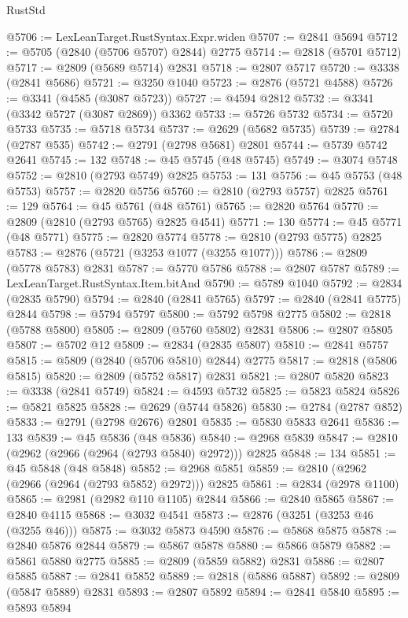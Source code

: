 \begin{lexlean}{RustStd}
\begin{coremodule}
@5706 := LexLeanTarget.RustSyntax.Expr.widen
@5707 := @2841 @5694
@5712 := @5705 (@2840 (@5706 @5707) @2844) @2775
@5714 := @2818 (@5701 @5712)
@5717 := @2809 (@5689 @5714) @2831
@5718 := @2807 @5717
@5720 := @3338 (@2841 @5686)
@5721 := @3250 @1040
@5723 := @2876 (@5721 @4588)
@5726 := @3341 (@4585 (@3087 @5723))
@5727 := @4594 @2812
@5732 := @3341 (@3342 @5727 (@3087 @2869)) @3362
@5733 := @5726 @5732
@5734 := @5720 @5733
@5735 := @5718 @5734
@5737 := @2629 (@5682 @5735)
@5739 := @2784 (@2787 @535)
@5742 := @2791 (@2798 @5681) @2801
@5744 := @5739 @5742 @2641
@5745 := 132
@5748 := @45 @5745 (@48 @5745)
@5749 := @3074 @5748
@5752 := @2810 (@2793 @5749) @2825
@5753 := 131
@5756 := @45 @5753 (@48 @5753)
@5757 := @2820 @5756
@5760 := @2810 (@2793 @5757) @2825
@5761 := 129
@5764 := @45 @5761 (@48 @5761)
@5765 := @2820 @5764
@5770 := @2809 (@2810 (@2793 @5765) @2825 @4541)
@5771 := 130
@5774 := @45 @5771 (@48 @5771)
@5775 := @2820 @5774
@5778 := @2810 (@2793 @5775) @2825
@5783 := @2876 (@5721 (@3253 @1077 (@3255 @1077)))
@5786 := @2809 (@5778 @5783) @2831
@5787 := @5770 @5786
@5788 := @2807 @5787
@5789 := LexLeanTarget.RustSyntax.Item.bitAnd
@5790 := @5789 @1040
@5792 := @2834 (@2835 @5790)
@5794 := @2840 (@2841 @5765)
@5797 := @2840 (@2841 @5775) @2844
@5798 := @5794 @5797
@5800 := @5792 @5798 @2775
@5802 := @2818 (@5788 @5800)
@5805 := @2809 (@5760 @5802) @2831
@5806 := @2807 @5805
@5807 := @5702 @12
@5809 := @2834 (@2835 @5807)
@5810 := @2841 @5757
@5815 := @5809 (@2840 (@5706 @5810) @2844) @2775
@5817 := @2818 (@5806 @5815)
@5820 := @2809 (@5752 @5817) @2831
@5821 := @2807 @5820
@5823 := @3338 (@2841 @5749)
@5824 := @4593 @5732
@5825 := @5823 @5824
@5826 := @5821 @5825
@5828 := @2629 (@5744 @5826)
@5830 := @2784 (@2787 @852)
@5833 := @2791 (@2798 @2676) @2801
@5835 := @5830 @5833 @2641
@5836 := 133
@5839 := @45 @5836 (@48 @5836)
@5840 := @2968 @5839
@5847 := @2810 (@2962 (@2966 (@2964 (@2793 @5840) @2972))) @2825
@5848 := 134
@5851 := @45 @5848 (@48 @5848)
@5852 := @2968 @5851
@5859 := @2810 (@2962 (@2966 (@2964 (@2793 @5852) @2972))) @2825
@5861 := @2834 (@2978 @1100)
@5865 := @2981 (@2982 @110 @1105) @2844
@5866 := @2840 @5865
@5867 := @2840 @4115
@5868 := @3032 @4541
@5873 := @2876 (@3251 (@3253 @46 (@3255 @46)))
@5875 := @3032 @5873 @4590
@5876 := @5868 @5875
@5878 := @2840 @5876 @2844
@5879 := @5867 @5878
@5880 := @5866 @5879
@5882 := @5861 @5880 @2775
@5885 := @2809 (@5859 @5882) @2831
@5886 := @2807 @5885
@5887 := @2841 @5852
@5889 := @2818 (@5886 @5887)
@5892 := @2809 (@5847 @5889) @2831
@5893 := @2807 @5892
@5894 := @2841 @5840
@5895 := @5893 @5894

\end{coremodule}
\end{lexlean}

